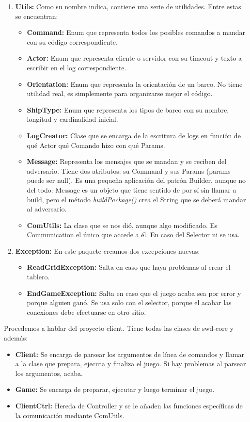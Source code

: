\begin{enumerate}
\item \textbf{Utils:} Como su nombre indica, contiene una serie de utilidades. Entre estas se encuentran:
	\begin{itemize}
	\item \textbf{Command:} Enum que representa todos los posibles comandos a mandar con su código correspondiente.
	\item \textbf{Actor:} Enum que representa cliente o servidor con su timeout y texto a escribir en el log correspondiente.
	\item \textbf{Orientation:} Enum que representa la orientación de un barco. No tiene utilidad real, es simplemente para organizarse mejor el código.
	\item \textbf{ShipType:} Enum que representa los tipos de barco con su nombre, longitud y cardinalidad inicial.
	\item \textbf{LogCreator:} Clase que se encarga de la escritura de logs en función de qué Actor qué Comando hizo con qué Params.
	\item \textbf{Message:} Representa los mensajes que se mandan y se reciben del adversario. Tiene dos atributos: su Command y sus Params (params puede ser null). Es una pequeña aplicación del patrón Builder, aunque no del todo: Message es un objeto que tiene sentido de por sí sin llamar a build, pero el método \textit{buildPackage()} crea el String que se deberá mandar al adversario.
	\item \textbf{ComUtils:} La clase que se nos dió, aunque algo modificado. Es Communication el único que accede a él. En caso del Selector ni se usa.
	\end{itemize}
\item \textbf{Exception:} En este paquete creamos dos excepciones nuevas:
	\begin{itemize}
	\item \textbf{ReadGridException:} Salta en caso que haya problemas al crear el tablero.
	\item \textbf{EndGameException:} Salta en caso que el juego acaba sea por error y porque alguien ganó. Se usa solo con el selector, porque el acabar las conexiones debe efectuarse en otro sitio.
	\end{itemize}
\end{enumerate}

Procedemos a hablar del proyecto client. Tiene todas las clases de swd-core y además:
\begin{itemize}
\item \textbf{Client:} Se encarga de parsear los argumentos de línea de comandos y llamar a la clase que prepara, ejecuta y finaliza el juego. Si hay problemas al parsear los argumentos, acaba.
\item \textbf{Game:} Se encarga de preparar, ejecutar y luego terminar el juego.
\item \textbf{ClientCtrl:} Hereda de Controller y se le añaden las funciones específicas de la comunicación mediante ComUtils.
\end{itemize}

